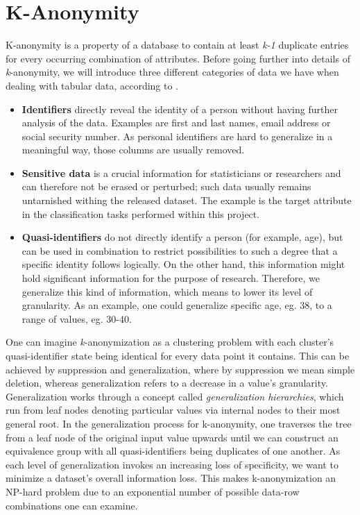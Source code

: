 \documentclass{article}
\begin{document}
\section{K-Anonymity}
K-anonymity is a property of a database to contain at least \textit{k-1} duplicate entries for every occurring combination of attributes. 
Before going further into details of \textit{k}-anonymity, we will introduce three different categories of data we have when dealing with tabular data, according to \cite{malle2017not}. 
\begin{itemize}
	\item\textbf{Identifiers} directly reveal the identity of a person without having further analysis of the data. Examples are first and last names, email address or social security number. As personal identifiers are hard to generalize in a meaningful way, those columns are usually removed. 
	\item\textbf{Sensitive data} is a crucial information for statisticians or researchers and can therefore not be erased or perturbed; such data usually remains untarnished withing the released dataset. The example is the target attribute in the classification tasks performed within this project. 
	\item\textbf{Quasi-identifiers} do not directly identify a person (for example, age), but can be used in combination to restrict possibilities to such a degree that a specific identity follows logically. On the other hand, this information might hold significant information for the purpose of research. Therefore, we generalize this kind of information, which means to lower its level of granularity. As an example, one could generalize specific age, eg. 38, to a range of values, eg. 30-40. 
\end{itemize}

One can imagine \textit{k}-anonymization as a clustering problem with each cluster's quasi-identifier state being identical for every data point it contains. This can be achieved by suppression and generalization, where by suppression we mean simple deletion, whereas generalization refers to a decrease in a value's granularity. 
Generalization works through a concept called \textit{generalization hierarchies}, which run from leaf nodes denoting particular values via internal nodes to their most general root. In the generalization process for k-anonymity, one traverses the tree from a leaf node of the original input value upwards until we can construct an equivalence group with all quasi-identifiers being duplicates of one another. 
As each level of generalization invokes an increasing loss of specificity, we want to minimize a dataset's overall information loss. This makes k-anonymization an NP-hard problem due to an exponential number of possible data-row combinations one can examine.
\end{document}
